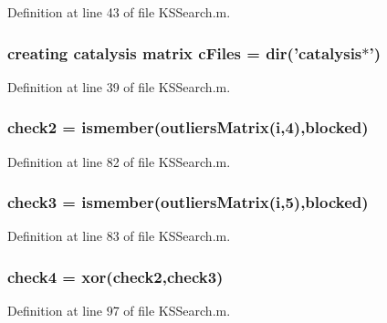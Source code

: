 Definition at line 43 of file K\-S\-Search.\-m.

\hypertarget{a00030_a9eab57ccb42a39c704f47dc30e4f4515}{
\subsubsection[{c\-Files}]{\setlength{\rightskip}{0pt plus 5cm}creating {\bf catalysis} matrix c\-Files = dir('{\bf catalysis}$\ast$')}}\label{a00030_a9eab57ccb42a39c704f47dc30e4f4515}


Definition at line 39 of file K\-S\-Search.\-m.

\hypertarget{a00030_a98a8838a85ed24032563a44271b1525a}{
\subsubsection[{check2}]{\setlength{\rightskip}{0pt plus 5cm}check2 = ismember({\bf outliers\-Matrix}({\bf i},4),{\bf blocked})}}\label{a00030_a98a8838a85ed24032563a44271b1525a}


Definition at line 82 of file K\-S\-Search.\-m.

\hypertarget{a00030_adfd17509248a56986475a25ee50fe488}{
\subsubsection[{check3}]{\setlength{\rightskip}{0pt plus 5cm}check3 = ismember({\bf outliers\-Matrix}({\bf i},5),{\bf blocked})}}\label{a00030_adfd17509248a56986475a25ee50fe488}


Definition at line 83 of file K\-S\-Search.\-m.

\hypertarget{a00030_ab21c5bac10f7ac73374c002e908df5ac}{
\subsubsection[{check4}]{\setlength{\rightskip}{0pt plus 5cm}check4 = xor({\bf check2},{\bf check3})}}\label{a00030_ab21c5bac10f7ac73374c002e908df5ac}


Definition at line 97 of file K\-S\-Search.\-m.

